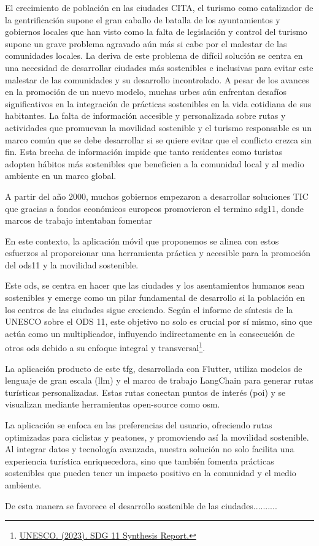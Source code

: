 

El crecimiento de población en las ciudades CITA, el turismo como catalizador de la gentrificación supone el gran caballo de batalla de los ayuntamientos y gobiernos locales que han visto como la falta de legislación y control del turismo supone un grave problema agravado aún más si cabe por el malestar de las comunidades locales. La deriva de este problema de difícil solución se centra en una necesidad de desarrollar ciudades más sostenibles e inclusivas para evitar este malestar de las comunidades y su desarrollo incontrolado. A pesar de los avances en la promoción de un nuevo modelo, muchas urbes aún enfrentan desafíos significativos en la integración de prácticas sostenibles en la vida cotidiana de sus habitantes. La falta de información accesible y personalizada sobre rutas y actividades que promuevan la movilidad sostenible y el turismo responsable es un marco común que se debe desarrollar si se quiere evitar que el conflicto crezca sin fin. Esta brecha de información impide que tanto residentes como turistas adopten hábitos más sostenibles que beneficien a la comunidad local y al medio ambiente en un marco global.

A partir del año 2000, muchos gobiernos empezaron a desarrollar soluciones TIC que gracias a fondos económicos europeos promovieron el termino \acrfull{sdg11}, donde marcos de trabajo intentaban fomentar 

En este contexto, la aplicación móvil que proponemos se alinea con estos esfuerzos al proporcionar una herramienta práctica y accesible para la promoción del \acrfull{ods11} y la movilidad sostenible.

Este \acrfull{ods}, se centra en hacer que las ciudades y los asentamientos humanos sean sostenibles y emerge como un pilar fundamental de desarrollo si la población en los centros de las ciudades sigue creciendo. Según el informe de síntesis de la UNESCO sobre el ODS 11, este objetivo no solo es crucial por sí mismo, sino que actúa como un multiplicador, influyendo indirectamente en la consecución de otros \acrshort{ods} debido a su enfoque integral y transversal\footnote{\href{https://uis.unesco.org/sites/default/files/documents/sdg_11_synthesis_report_2023_v11_0_4.pdf}{UNESCO. (2023). SDG 11 Synthesis Report.}}.

La aplicación producto de este \acrshort{tfg}, desarrollada con Flutter, utiliza modelos de lenguaje de gran escala (\acrfull{llm}) y el marco de trabajo LangChain para generar rutas turísticas personalizadas. Estas rutas conectan puntos de interés (\acrfull{poi}) y se visualizan mediante herramientas open-source como \acrfull{osm}.

La aplicación se enfoca en las preferencias del usuario, ofreciendo rutas optimizadas para ciclistas y peatones, y promoviendo así la movilidad sostenible. Al integrar datos y tecnología avanzada, nuestra solución no solo facilita una experiencia turística enriquecedora, sino que también fomenta prácticas sostenibles que pueden tener un impacto positivo en la comunidad y el medio ambiente.

De esta manera se favorece el desarrollo sostenible de las ciudades..........

